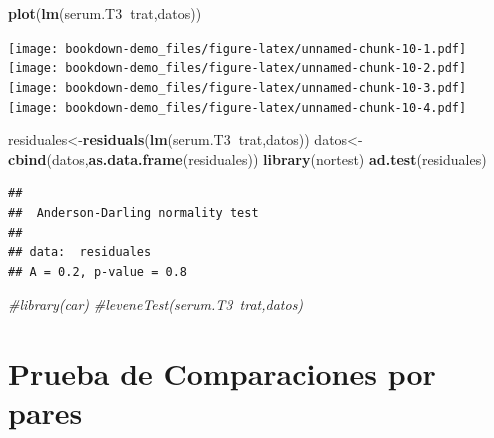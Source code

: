 \documentclass[]{book}
\newenvironment{Shaded}{\begin{snugshade}}{\end{snugshade}}
\newcommand{\KeywordTok}[1]{\textcolor[rgb]{0.13,0.29,0.53}{\textbf{#1}}}
\newcommand{\DataTypeTok}[1]{\textcolor[rgb]{0.13,0.29,0.53}{#1}}
\newcommand{\StringTok}[1]{\textcolor[rgb]{0.31,0.60,0.02}{#1}}
\newcommand{\CommentTok}[1]{\textcolor[rgb]{0.56,0.35,0.01}{\textit{#1}}}
\newcommand{\OperatorTok}[1]{\textcolor[rgb]{0.81,0.36,0.00}{\textbf{#1}}}
\newcommand{\NormalTok}[1]{#1}
\begin{document}
\begin{Shaded}
\begin{Highlighting}[]
\KeywordTok{plot}\NormalTok{(}\KeywordTok{lm}\NormalTok{(serum.T3}\OperatorTok{~}\NormalTok{trat,datos))}
\end{Highlighting}
\end{Shaded}

\texttt{[image: bookdown-demo\_files/figure-latex/unnamed-chunk-10-1.pdf]}
\texttt{[image: bookdown-demo\_files/figure-latex/unnamed-chunk-10-2.pdf]}
\texttt{[image: bookdown-demo\_files/figure-latex/unnamed-chunk-10-3.pdf]}
\texttt{[image: bookdown-demo\_files/figure-latex/unnamed-chunk-10-4.pdf]}

\begin{Shaded}
\begin{Highlighting}[]
\NormalTok{residuales<-}\KeywordTok{residuals}\NormalTok{(}\KeywordTok{lm}\NormalTok{(serum.T3}\OperatorTok{~}\NormalTok{trat,datos))}
\NormalTok{datos<-}\KeywordTok{cbind}\NormalTok{(datos,}\KeywordTok{as.data.frame}\NormalTok{(residuales))}
\KeywordTok{library}\NormalTok{(nortest)}
\KeywordTok{ad.test}\NormalTok{(residuales)}
\end{Highlighting}
\end{Shaded}

\begin{verbatim}
## 
##  Anderson-Darling normality test
## 
## data:  residuales
## A = 0.2, p-value = 0.8
\end{verbatim}

\begin{Shaded}
\begin{Highlighting}[]
\CommentTok{#library(car)}
\CommentTok{#leveneTest(serum.T3~trat,datos)}
\end{Highlighting}
\end{Shaded}

\section{Prueba de Comparaciones por
pares}\label{prueba-de-comparaciones-por-pares}

\begin{Shaded}
\end{Shaded}
\end{document}
